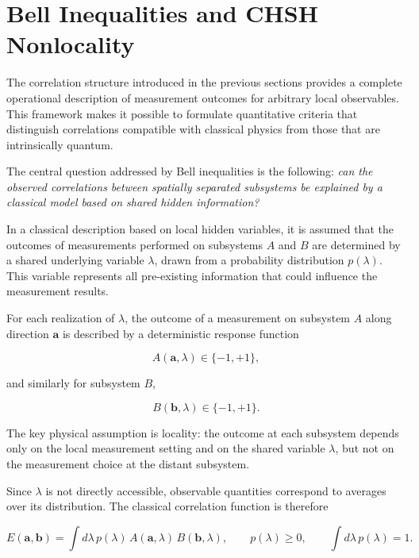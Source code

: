 \section{Bell Inequalities and CHSH Nonlocality}

The correlation structure introduced in the previous sections provides a complete operational description of measurement outcomes for arbitrary local observables. This framework makes it possible to formulate quantitative criteria that distinguish correlations compatible with classical physics from those that are intrinsically quantum.

\medskip

The central question addressed by Bell inequalities is the following: \emph{can the observed correlations between spatially separated subsystems be explained by a classical model based on shared hidden information?}

\medskip

In a classical description based on local hidden variables, it is assumed that the outcomes of measurements performed on subsystems \( A \) and \( B \) are determined by a shared underlying variable \( \lambda \), drawn from a probability distribution \( p(\lambda) \). This variable represents all pre-existing information that could influence the measurement results.

\medskip

For each realization of \( \lambda \), the outcome of a measurement on subsystem \( A \) along direction \( \mathbf{a} \) is described by a deterministic response function

\[
A(\mathbf{a},\lambda) \in \{-1,+1\},
\]

and similarly for subsystem \( B \),

\[
B(\mathbf{b},\lambda) \in \{-1,+1\}.
\]

\medskip

The key physical assumption is locality: the outcome at each subsystem depends only on the local measurement setting and on the shared variable \( \lambda \), but not on the measurement choice at the distant subsystem.

Since \( \lambda \) is not directly accessible, observable quantities correspond to averages over its distribution. The classical correlation function is therefore \cite{bell_epr_paradox_1964}

\begin{equation}
E(\mathbf{a},\mathbf{b})
=
\int d\lambda\,
p(\lambda)\,
A(\mathbf{a},\lambda)\,
B(\mathbf{b},\lambda),
\qquad
p(\lambda) \ge 0,
\qquad
\int d\lambda\,p(\lambda)=1.
\label{eq:local_hidden_variable_correlation}
\end{equation}

